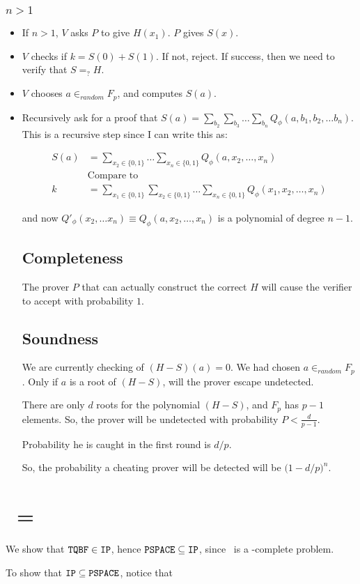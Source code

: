 \subsubsection{$n > 1$}
\begin{itemize}
\item If $n > 1$, $V$ asks $P$ to give $H(x_1)$. $P$ gives $S(x)$.

\item $V$ checks if $k = S(0) + S(1)$. If not, reject. If success, then we need
to verify that $S =_? H$.

\item $V$ chooses $a \in_{random} F_p$, and computes $S(a)$.

\item Recursively ask for a proof that $S(a) = \sum_{b_2} \sum_{b_3} \dots \sum_{b_n} Q_\phi(a, b_1, b_2, \dots b_n)$.
This is a recursive step since I can write this as:

\begin{align*}
S(a) &= 
     \sum_{x_2 \in \{0, 1\}} \dots \sum_{x_n \in \{0, 1\}}
    Q_\phi(a, x_2, \dots, x_n) \\
    &\text{Compare to} \\
k &= 
    \sum_{x_1 \in \{0, 1\}} \sum_{x_2 \in \{0, 1\}} \dots \sum_{x_n \in \{0, 1\}}
    Q_\phi(x_1, x_2, \dots, x_n)
\end{align*}

and now $Q'_\phi(x_2, \dots x_n) \equiv Q_\phi(a, x_2, \dots, x_n)$ is a polynomial
of degree $n - 1$.


\subsection{Completeness}
The prover $P$ that can actually construct the correct $H$ will cause the verifier
to accept with probability $1$.

\subsection{Soundness}
We are currently checking of $(H - S)(a) = 0$. We had chosen $a \in_{random} F_p$.
Only if $a$ is a root of $(H - S)$, will the prover escape undetected.

There are only $d$ roots for the polynomial $(H - S)$, and $F_p$ has $p - 1$
elements. So, the prover will be undetected with probability $P < \frac{d}{p - 1}$.

Probability he is caught in the first round is $d/p$. 

So, the probability a cheating prover will be detected will be $\big(1 - d/p\big)^{n}$.
\end{itemize}

\section{\ip~= \pspace}

We show that $\texttt{TQBF} \in \texttt{IP}$, hence $\texttt{PSPACE} \subseteq \texttt{IP}$, since \tqbf~is
a \pspace-complete problem.

To show that $\texttt{IP} \subseteq \texttt{PSPACE}$, notice that 




